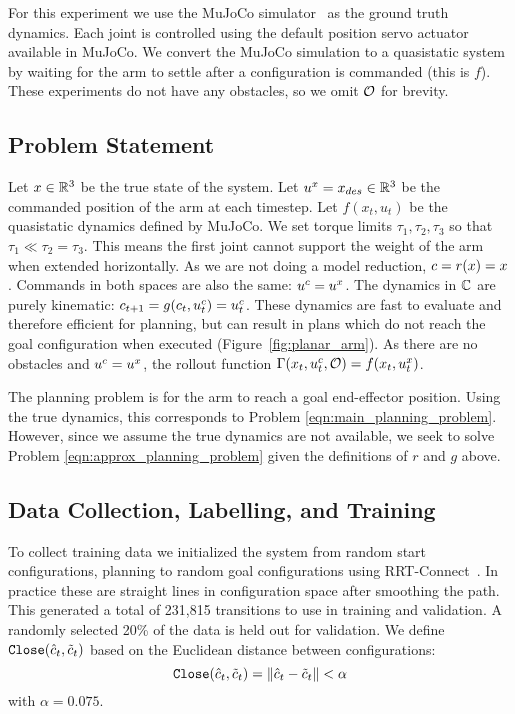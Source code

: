 For this experiment we use the MuJoCo simulator~\cite{mujoco} as the ground truth dynamics. Each joint is controlled using the default position servo actuator available in MuJoCo. We convert the MuJoCo simulation to a quasistatic system by waiting for the arm to settle after a configuration is commanded (this is $f$). These experiments do not have any obstacles, so we omit $\mathcal{O}$ for brevity.


\subsection{Problem Statement}

Let $x \in \mathbb{R}^3$ be the true state of the system. Let $u^x = x_{des} \in \mathbb{R}^3$ be the commanded position of the arm at each timestep. Let $f(x_t, u_t)$ be the quasistatic dynamics defined by MuJoCo. We set torque limits $\tau_1, \tau_2, \tau_3$ so that $\tau_1 \ll \tau_2 = \tau_3$. This means the first joint cannot support the weight of the arm when extended horizontally. As we are not doing a model reduction, $c = r(x) = x$. Commands in both spaces are also the same: $u^c = u^x$. The dynamics in $\mathbb{C}$ are purely kinematic: $c_{t+1} = g(c_t, u^c_t) = u^c_t$. These dynamics are fast to evaluate and therefore efficient for planning, but can result in plans which do not reach the goal configuration when executed (Figure~\ref{fig:planar_arm}). As there are no obstacles and $u^c = u^x$, the rollout function $\Gamma(x_t, u^c_t, \mathcal{O}) = f(x_t, u_t^x)$.

The planning problem is for the arm to reach a goal end-effector position. Using the true dynamics, this corresponds to Problem \eqref{eqn:main_planning_problem}. However, since we assume the true dynamics are not available, we seek to solve Problem \eqref{eqn:approx_planning_problem} given the definitions of $r$ and $g$ above.


\subsection{Data Collection, Labelling, and Training}

To collect training data we initialized the system from random start configurations, planning to random goal configurations using RRT-Connect~\cite{kuffner2000rrt}. In practice these are straight lines in configuration space after smoothing the path. This generated a total of 231,815 transitions to use in training and validation. A randomly selected 20\% of the data is held out for validation. We define $\texttt{Close}(\hat{c}_t, \tilde{c}_t)$ based on the Euclidean distance between configurations:
\begin{equation}
    \texttt{Close}(\hat{c}_t, \tilde{c}_t) = \| \hat{c}_t - \tilde{c}_t \| < \alpha
\end{equation}
with $\alpha = 0.075$.

